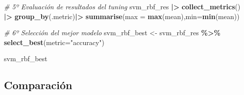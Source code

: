 \documentclass[12pt,a4paper,]{book}
\newenvironment{Shaded}{\begin{snugshade}}{\end{snugshade}}
\newcommand{\AttributeTok}[1]{\textcolor[rgb]{0.13,0.29,0.53}{#1}}
\newcommand{\CommentTok}[1]{\textcolor[rgb]{0.56,0.35,0.01}{\textit{#1}}}
\newcommand{\FunctionTok}[1]{\textcolor[rgb]{0.13,0.29,0.53}{\textbf{#1}}}
\newcommand{\NormalTok}[1]{#1}
\newcommand{\OtherTok}[1]{\textcolor[rgb]{0.56,0.35,0.01}{#1}}
\newcommand{\SpecialCharTok}[1]{\textcolor[rgb]{0.81,0.36,0.00}{\textbf{#1}}}
\newcommand{\StringTok}[1]{\textcolor[rgb]{0.31,0.60,0.02}{#1}}
\numberwithin{dummy}{section}
\theoremstyle{ocrenumbox}
\theoremstyle{blacknumex}
\theoremstyle{blacknumbox}
\theoremstyle{ocrenum}
\theoremstyle{ocrenum}
\begin{document}
\begin{Shaded}
\begin{Highlighting}[]
\CommentTok{\# 5º Evaluación de resultados del tuning}
\NormalTok{svm\_rbf\_res }\SpecialCharTok{|\textgreater{}} 
  \FunctionTok{collect\_metrics}\NormalTok{() }\SpecialCharTok{|\textgreater{}} 
  \FunctionTok{group\_by}\NormalTok{(.metric)}\SpecialCharTok{|\textgreater{}} 
  \FunctionTok{summarise}\NormalTok{(}\AttributeTok{max =} \FunctionTok{max}\NormalTok{(mean),}\AttributeTok{min=}\FunctionTok{min}\NormalTok{(mean))}

\CommentTok{\# 6º Selección del mejor modelo}
\NormalTok{svm\_rbf\_best }\OtherTok{\textless{}{-}} 
\NormalTok{  svm\_rbf\_res }\SpecialCharTok{\%\textgreater{}\%} 
  \FunctionTok{select\_best}\NormalTok{(}\AttributeTok{metric=}\StringTok{"accuracy"}\NormalTok{)}

\NormalTok{svm\_rbf\_best}
\end{Highlighting}
\end{Shaded}

\hypertarget{comparaciuxf3n-1}{%
\subsection{Comparación}\label{comparaciuxf3n-1}}
\end{document}
